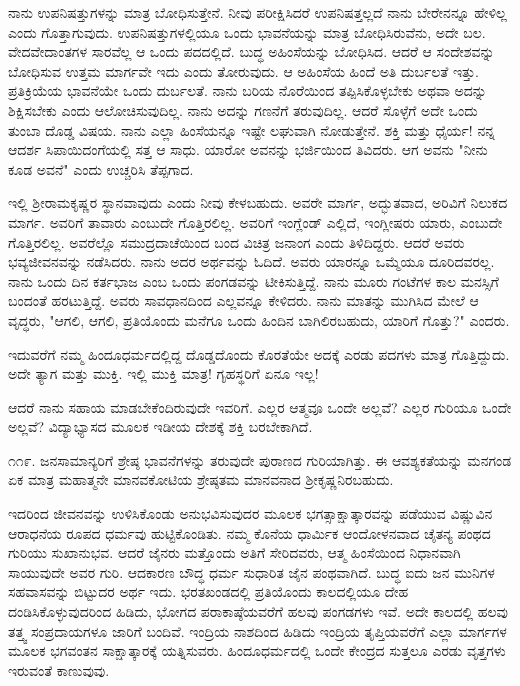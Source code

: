 ನಾನು ಉಪನಿಷತ್ತುಗಳನ್ನು ಮಾತ್ರ ಬೋಧಿಸುತ್ತೇನೆ. ನೀವು ಪರೀಕ್ಷಿಸಿದರೆ ಉಪನಿಷತ್ತಲ್ಲದೆ ನಾನು ಬೇರೇನನ್ನೂ ಹೇಳಿಲ್ಲ ಎಂದು ಗೊತ್ತಾಗುವುದು. ಉಪನಿಷತ್ತುಗಳಲ್ಲಿಯೂ ಒಂದು ಭಾವನೆಯನ್ನು ಮಾತ್ರ ಬೋಧಿಸಿರುವೆನು, ಅದೇ ಬಲ. ವೇದವೇದಾಂತಗಳ ಸಾರವೆಲ್ಲ ಆ ಒಂದು ಪದದಲ್ಲಿದೆ. ಬುದ್ಧ ಅಹಿಂಸೆಯನ್ನು ಬೋಧಿಸಿದ. ಆದರೆ ಆ ಸಂದೇಶವನ್ನು ಬೋಧಿಸುವ ಉತ್ತಮ ಮಾರ್ಗವೇ ಇದು ಎಂದು ತೋರುವುದು. ಆ ಅಹಿಂಸೆಯ ಹಿಂದೆ ಅತಿ ದುರ್ಬಲತೆ ಇತ್ತು. ಪ್ರತಿಕ್ರಿಯೆಯ ಭಾವನೆಯೇ ಒಂದು ದುರ್ಬಲತೆ. ನಾನು ಬರಿಯ ನೊರೆಯಿಂದ ತಪ್ಪಿಸಿಕೊಳ್ಳಬೇಕು ಅಥವಾ ಅದನ್ನು ಶಿಕ್ಷಿಸಬೇಕು ಎಂದು ಆಲೋಚಿಸುವುದಿಲ್ಲ. ನಾನು ಅದನ್ನು ಗಣನೆಗೆ ತರುವುದಿಲ್ಲ. ಆದರೆ ಸೊಳ್ಳೆಗೆ ಅದೇ ಒಂದು ತುಂಬಾ ದೊಡ್ಡ ವಿಷಯ. ನಾನು ಎಲ್ಲಾ ಹಿಂಸೆಯನ್ನೂ ಇಷ್ಟೇ ಲಘುವಾಗಿ ನೋಡುತ್ತೇನೆ. ಶಕ್ತಿ ಮತ್ತು ಧೈರ್ಯ! ನನ್ನ ಆದರ್ಶ ಸಿಪಾಯಿದಂಗೆಯಲ್ಲಿ ಸತ್ತ ಆ ಸಾಧು. ಯಾರೋ ಅವನನ್ನು ಭರ್ಜಿಯಿಂದ ತಿವಿದರು. ಆಗ ಅವನು "ನೀನು ಕೂಡ ಅವನೆ" ಎಂದು ಉಚ್ಚರಿಸಿ ತೆಪ್ಪಗಾದ.

ಇಲ್ಲಿ ಶ‍್ರೀರಾಮಕೃಷ್ಣರ ಸ್ಥಾನವಾವುದು ಎಂದು ನೀವು ಕೇಳಬಹುದು. ಅವರೇ ಮಾರ್ಗ, ಅದ್ಭುತವಾದ, ಅರಿವಿಗೆ ನಿಲುಕದ ಮಾರ್ಗ. ಅವರಿಗೆ ತಾವಾರು ಎಂಬುದೇ ಗೊತ್ತಿರಲಿಲ್ಲ. ಅವರಿಗೆ ಇಂಗ್ಲೆಂಡ್ ಎಲ್ಲಿದೆ, ಇಂಗ್ಲೀಷರು ಯಾರು, ಎಂಬುದೇ ಗೊತ್ತಿರಲಿಲ್ಲ. ಅವರೆಲ್ಲೊ ಸಮುದ್ರದಾಚೆಯಿಂದ ಬಂದ ವಿಚಿತ್ರ ಜನಾಂಗ ಎಂದು ತಿಳಿದಿದ್ದರು. ಆದರೆ ಅವರು ಭವ್ಯಜೀವನವನ್ನು ನಡೆಸಿದರು. ನಾನು ಅದರ ಅರ್ಥವನ್ನು ಓದಿದೆ. ಅವರು ಯಾರನ್ನೂ ಒಮ್ಮೆಯೂ ದೂರಿದವರಲ್ಲ. ನಾನು ಒಂದು ದಿನ ಕರ್ತಭಾಜ ಎಂಬ ಒಂದು ಪಂಗಡವನ್ನು ಟೀಕಿಸುತ್ತಿದ್ದೆ. ನಾನು ಮೂರು ಗಂಟೆಗಳ ಕಾಲ ಮನಸ್ಸಿಗೆ ಬಂದಂತೆ ಹರಟುತ್ತಿದ್ದೆ. ಅವರು ಸಾವಧಾನದಿಂದ ಎಲ್ಲವನ್ನೂ ಕೇಳಿದರು. ನಾನು ಮಾತನ್ನು ಮುಗಿಸಿದ ಮೇಲೆ ಆ ವೃದ್ಧರು, "ಆಗಲಿ, ಆಗಲಿ, ಪ್ರತಿಯೊಂದು ಮನೆಗೂ ಒಂದು ಹಿಂದಿನ ಬಾಗಿಲಿರಬಹುದು, ಯಾರಿಗೆ ಗೊತ್ತು?" ಎಂದರು.

ಇದುವರೆಗೆ ನಮ್ಮ ಹಿಂದೂಧರ್ಮದಲ್ಲಿದ್ದ ದೊಡ್ಡದೊಂದು ಕೊರತೆಯೇ ಅದಕ್ಕೆ ಎರಡು ಪದಗಳು ಮಾತ್ರ ಗೊತ್ತಿದ್ದುದು. ಅದೇ ತ್ಯಾಗ ಮತ್ತು ಮುಕ್ತಿ. ಇಲ್ಲಿ ಮುಕ್ತಿ ಮಾತ್ರ! ಗೃಹಸ್ಥರಿಗೆ ಏನೂ ಇಲ್ಲ!

ಆದರೆ ನಾನು ಸಹಾಯ ಮಾಡಬೇಕೆಂದಿರುವುದೇ ಇವರಿಗೆ. ಎಲ್ಲರ ಆತ್ಮವೂ ಒಂದೇ ಅಲ್ಲವೆ? ಎಲ್ಲರ ಗುರಿಯೂ ಒಂದೇ ಅಲ್ಲವೆ? ವಿದ್ಯಾಭ್ಯಾಸದ ಮೂಲಕ ಇಡೀಯ ದೇಶಕ್ಕೆ ಶಕ್ತಿ ಬರಬೇಕಾಗಿದೆ.

೧೧೯. ಜನಸಾಮಾನ್ಯರಿಗೆ ಶ್ರೇಷ್ಠ ಭಾವನೆಗಳನ್ನು ತರುವುದೇ ಪುರಾಣದ ಗುರಿಯಾಗಿತ್ತು. ಈ ಆವಶ್ಯಕತೆಯನ್ನು ಮನಗಂಡ ಏಕ ಮಾತ್ರ ಮಹಾತ್ಮನೇ ಮಾನವಕೋಟಿಯ ಶ್ರೇಷ್ಠತಮ ಮಾನವನಾದ ಶ‍್ರೀಕೃಷ್ಣನಿರಬಹುದು.

ಇದರಿಂದ ಜೀವನವನ್ನು ಉಳಿಸಿಕೊಂಡು ಅನುಭವಿಸುವುದರ ಮೂಲಕ ಭಗತ್ಸಾಕ್ಷಾತ್ಕಾರವನ್ನು ಪಡೆಯುವ ವಿಷ್ಣುವಿನ ಆರಾಧನೆಯ ರೂಪದ ಧರ್ಮವು ಹುಟ್ಟಿಕೊಂಡಿತು. ನಮ್ಮ ಕೊನೆಯ ಧಾರ್ಮಿಕ ಆಂದೋಳನವಾದ ಚೈತನ್ಯ ಪಂಥದ ಗುರಿಯು ಸುಖಾನುಭವ. ಆದರೆ ಜೈನರು ಮತ್ತೊಂದು ಅತಿಗೆ ಸೇರಿದವರು, ಆತ್ಮ ಹಿಂಸೆಯಿಂದ ನಿಧಾನವಾಗಿ ಸಾಯುವುದೇ ಅವರ ಗುರಿ. ಆದಕಾರಣ ಬೌದ್ಧ ಧರ್ಮ ಸುಧಾರಿತ ಜೈನ ಪಂಥವಾಗಿದೆ. ಬುದ್ಧ ಐದು ಜನ ಮುನಿಗಳ ಸಹವಾಸವನ್ನು ಬಿಟ್ಟುದರ ಅರ್ಥ ಇದು. ಭರತಖಂಡದಲ್ಲಿ ಪ್ರತಿಯೊಂದು ಕಾಲದಲ್ಲಿಯೂ ದೇಹ ದಂಡಿಸಿಕೊಳ್ಳುವುದರಿಂದ ಹಿಡಿದು, ಭೋಗದ ಪರಾಕಾಷ್ಠೆಯವರೆಗೆ ಹಲವು ಪಂಗಡಗಳು ಇವೆ. ಅದೇ ಕಾಲದಲ್ಲಿ ಹಲವು ತತ್ತ್ವ ಸಂಪ್ರದಾಯಗಳೂ ಜಾರಿಗೆ ಬಂದಿವೆ. ಇಂದ್ರಿಯ ನಾಶದಿಂದ ಹಿಡಿದು ಇಂದ್ರಿಯ ತೃಪ್ತಿಯವರೆಗೆ ಎಲ್ಲಾ ಮಾರ್ಗಗಳ ಮೂಲಕ ಭಗವಂತನ ಸಾಕ್ಷಾತ್ಕಾರಕ್ಕೆ ಯತ್ನಿಸುವರು. ಹಿಂದೂಧರ್ಮದಲ್ಲಿ ಒಂದೇ ಕೇಂದ್ರದ ಸುತ್ತಲೂ ಎರಡು ವೃತ್ತಗಳು ಇರುವಂತೆ ಕಾಣುವುವು.

